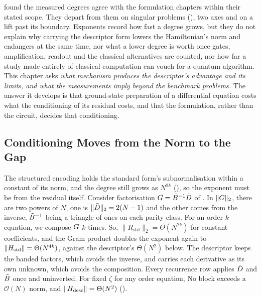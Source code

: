  found the measured degrees agree with the formulation chapters within their stated scope. They depart from them on singular problems (), two axes and on a lift past its boundary. Exponents record how fast a degree grows, but they do not explain why carrying the descriptor form lowers the Hamiltonian's norm and endangers at the same time, nor what a lower degree is worth once gates, amplification, readout and the classical alternatives are counted, nor how far a study made entirely of classical computation can vouch for a quantum algorithm. This chapter asks \emph{what mechanism produces the descriptor's advantage and its limits, and what the measurements imply beyond the benchmark problems.} The answer it develops is that ground-state preparation of a differential equation costs what the conditioning of its residual costs, and that the formulation, rather than the circuit, decides that conditioning.

\subsection{Conditioning Moves from the Norm to the Gap}
\label{sec:disc-tradeoff}

The structured encoding holds the standard form's subnormalisation within a constant of its norm, and the degree still grows as $N^{2k}$ (), so the exponent must be from the residual itself. Consider factorisation $G=\tilde{B}^{-1}\tilde{D}$ of . In $\|G\|_2$, there are two powers of $N$, one is $\|\tilde{D}\|_2=2(N-1)$ and the other comes from the inverse, $\tilde{B}^{-1}$ being a triangle of ones on each parity class. For an order $k$ equation, we compose $G$ $k$ times. So, $\|R_{\mathrm{std}}\|_2=\Theta(N^{2k})$ for constant coefficients, and the Gram product doubles the exponent again to $\|H_{\mathrm{std}}\|=\Theta(N^{4k})$, against the descriptor's $\Theta(N^2)$ below. The descriptor keeps the banded factors, which avoids the inverse, and carries each derivative as its own unknown, which avoids the composition. Every recurrence row applies $\tilde{D}$ and $\tilde{B}$ once and uninverted. For fixed $\zeta$ for any order equation, No block exceeds a $\mathcal O(N)$ norm, and $\|H_{\mathrm{desc}}\|=\Theta(N^2)$ ().

